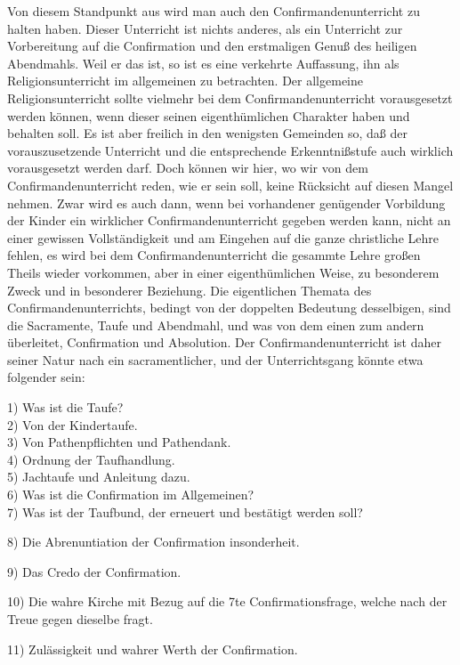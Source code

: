 Von diesem Standpunkt aus wird man auch den Confirmandenunterricht zu halten haben. Dieser Unterricht ist nichts anderes, als ein Unterricht zur Vorbereitung auf die Confirmation und den erstmaligen Genuß des heiligen Abendmahls. Weil er das ist, so ist es eine verkehrte Auffassung, ihn als Religionsunterricht im allgemeinen zu betrachten. Der allgemeine Religionsunterricht sollte vielmehr bei dem Confirmandenunterricht vorausgesetzt werden können, wenn dieser seinen eigenthümlichen Charakter haben und behalten soll. Es ist aber freilich in den wenigsten Gemeinden so, daß der
vorauszusetzende Unterricht und die entsprechende Erkenntnißstufe auch wirklich vorausgesetzt werden darf. Doch können wir hier, wo wir von dem Confirmandenunterricht reden, wie er sein soll, keine Rücksicht auf diesen Mangel nehmen. Zwar wird es auch dann, wenn bei vorhandener genügender Vorbildung der Kinder ein wirklicher Confirmandenunterricht gegeben werden kann, nicht an einer gewissen Vollständigkeit und am Eingehen auf die ganze christliche Lehre fehlen, es wird bei dem Confirmandenunterricht die gesammte Lehre großen Theils wieder vorkommen, aber in einer eigenthümlichen Weise, zu besonderem Zweck und in besonderer Beziehung. Die eigentlichen Themata des Confirmandenunterrichts, bedingt von der doppelten Bedeutung desselbigen, sind die Sacramente, Taufe und Abendmahl, und was von dem einen zum andern überleitet, Confirmation und Absolution. Der Confirmandenunterricht ist daher seiner Natur nach ein sacramentlicher, und der Unterrichtsgang könnte etwa folgender sein:

1) Was ist die Taufe?\\
2) Von der Kindertaufe.\\
3) Von Pathenpflichten und Pathendank.\\
4) Ordnung der Taufhandlung.\\
5) Jachtaufe und Anleitung dazu.\\
6) Was ist die Confirmation im Allgemeinen?\\
7) Was ist der Taufbund, der erneuert und bestätigt werden soll?

8) Die Abrenuntiation der Confirmation insonderheit.

9) Das Credo der Confirmation.

10) Die wahre Kirche mit Bezug auf die 7te Confirmationsfrage, welche nach der Treue gegen dieselbe fragt.

11) Zulässigkeit und wahrer Werth der Confirmation.

